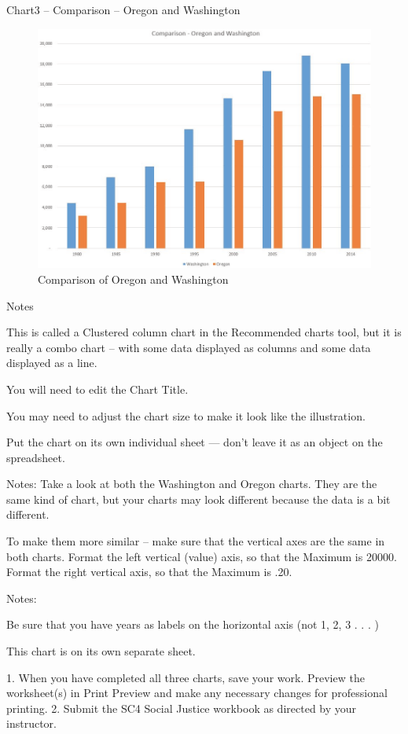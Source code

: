 Chart3 – Comparison – Oregon and Washington

\begin{figure}[H]
	\centering
	\includegraphics[width=\maxwidth{.95\linewidth}]{gfx/ch04_fig58}
	\caption{Comparison of Oregon and Washington}
	\label{04:fig58}
\end{figure}



Notes

This is called a Clustered column chart in the Recommended charts tool, but it is really a combo chart – with some
data displayed as columns and some data displayed as a line.

You will need to edit the Chart Title.

You may need to adjust the chart size to make it look like the illustration.

Put the chart on its own individual sheet — don’t leave it as an object on the spreadsheet.





Notes:
Take a look at both the Washington and Oregon charts. They are the same kind of chart, but your charts may look
different because the data is a bit different.

To make them more similar – make sure that the vertical axes are the same in both charts. Format the left vertical
(value) axis, so that the Maximum is 20000. Format the right vertical axis, so that the Maximum is .20.




Notes:

Be sure that you have years as labels on the horizontal axis (not 1, 2, 3 . . . )

This chart is on its own separate sheet.




1. When you have completed all three charts, save your work. Preview the worksheet(s) in Print
Preview and make any necessary changes for professional printing.
2. Submit the SC4 Social Justice workbook as directed by your instructor.


